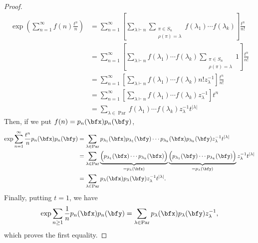 \documentclass{article}
\DeclareMathOperator{\Par}{Par}
\begin{document}
\begin{proof}
\begin{align*}
        \exp
        \left(
            \sum_{n=1}^\infty
            f(n)
            \frac{t^n}{n}
        \right)
        &=
        \sum_{n=1}^\infty
        \left[
            \sum_{\lambda \vdash n}
            \sum_{
                \substack{
                \pi \in S_n \\
                \rho(\pi) = \lambda
                }
            }
            f(\lambda_1) \cdots f(\lambda_k)
        \right]
        \frac{t^n}{n!} \\
        &=
        \sum_{n=1}^\infty
        \left[
            \sum_{\lambda \vdash n}
            f(\lambda_1) \cdots f(\lambda_k)
            \sum_{
                \substack{
                \pi \in S_n \\
                \rho(\pi) = \lambda
                }
            }
            1 
        \right]
        \frac{t^n}{n!} \\
        &=
        \sum_{n=1}^\infty
        \left[
            \sum_{\lambda \vdash n}
            f(\lambda_1) \cdots f(\lambda_k)
            n!
            z_\lambda^{-1}
        \right]
        \frac{t^n}{n!} \\
        &=
        \sum_{n=1}^\infty
        \left[
            \sum_{\lambda \vdash n}
            f(\lambda_1) \cdots f(\lambda_k)
            z_\lambda^{-1}
        \right]
        t^n \\
        &=
        \sum_{\lambda \in \Par}
        f(\lambda_1) \cdots f(\lambda_k) z_\lambda^{-1}
        t^{|\lambda|}
    \end{align*}
    Then, if we put $f(n) = p_n(\bfx)p_n(\bfy)$,
    \begin{align*}
        \exp
        \sum_{n=1}^\infty
        \frac{t^n}{n}
        p_n(\bfx) p_n(\bfy)
        &=
        \sum_{\lambda \in \Par}
        p_{\lambda_1}(\bfx) p_{\lambda_1}(\bfy)
        \cdots
        p_{\lambda_k}(\bfx) p_{\lambda_k}(\bfy)
        z_\lambda^{-1}
        t^{|\lambda|} \\
        &=
        \sum_{\lambda \in \Par}
        \underbrace{
            \Big(
                p_{\lambda_1}(\bfx) \cdots p_{\lambda_k}(\bfx)
            \Big)
        }_{=p_\lambda(\bfx)}
        \underbrace{
            \Big(
                p_{\lambda_1}(\bfy) \cdots p_{\lambda_k}(\bfy)
            \Big)
        }_{=p_\lambda(\bfy)}
        z_\lambda^{-1}
        t^{|\lambda|} \\
        &=
        \sum_{\lambda \in \Par}
        p_\lambda(\bfx) p_\lambda(\bfy) z_\lambda^{-1}
        t^{|\lambda|}.
    \end{align*}
    Finally, putting $t=1$, we have
    \[
        \exp
        \sum_{n \geq 1}
        \frac{1}{n}
        p_n(\bfx) p_n(\bfy)
        =
        \sum_{\lambda \in \Par}
        p_\lambda(\bfx) p_\lambda(\bfy) z_\lambda^{-1},
    \]
    which proves the first equality.


\end{proof}
\end{document}
